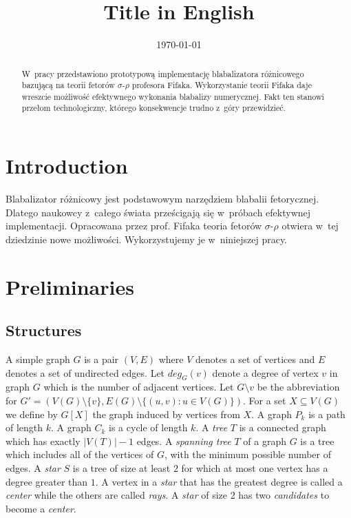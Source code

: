 \documentclass[en]{pracamgr}
\title{Title in English}
\date{\monthyeardate\today}
\begin{document}
\maketitle

\begin{abstract}
  W~pracy przedstawiono prototypową implementację blabalizatora
  różnicowego bazującą na teorii fetorów $\sigma$-$\rho$ profesora
  Fifaka.  Wykorzystanie teorii Fifaka daje wreszcie możliwość
  efektywnego wykonania blabalizy numerycznej.  Fakt ten stanowi
  przełom technologiczny, którego konsekwencje trudno z~góry
  przewidzieć.
\end{abstract}

\tableofcontents

\chapter*{Introduction}

Blabalizator różnicowy jest podstawowym narzędziem blabalii
fetorycznej.  Dlatego naukowcy z~całego świata prześcigają się
w~próbach efektywnej implementacji.  Opracowana przez prof. Fifaka
teoria fetorów $\sigma$-$\rho$ otwiera w~tej dziedzinie nowe
możliwości.  Wykorzystujemy je w~niniejszej pracy.

\chapter{Preliminaries}\label{r:pojecia}

\section{Structures}

A simple graph $G$ is a pair $(V,E)$ where $V$ denotes a set of vertices and $E$ denotes a set of undirected edges. Let $deg_G(v)$ denote a degree of vertex $v$ in graph $G$ which is the number of adjacent vertices. Let $G \setminus v$ be the abbreviation for $G'=(V(G) \setminus \{v\}, E(G) \setminus \{(u,v): u \in V(G)\})$. For a set $X \subseteq V(G)$ we define by $G[X]$ the graph induced by vertices from $X$. A graph $P_k$ is a path of length $k$. A graph $C_k$ is a cycle of length $k$. A \emph{tree} $T$ is a connected graph which has exactly $|V(T)|-1$ edges. A \emph{spanning tree} $T$ of a graph $G$ is a tree which includes all of the vertices of $G$, with the minimum possible number of edges. A \emph{star} $S$ is a tree of size at least $2$ for which at most one vertex has a degree greater than $1$. A vertex in a \emph{star} that has the greatest degree is called a \emph{center} while the others are called \emph{rays}. A \emph{star} of size 2 has two \emph{candidates} to become a \emph{center}.
\end{document}
